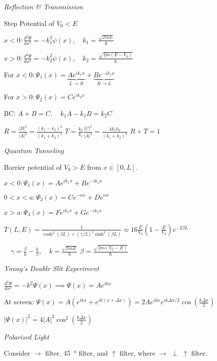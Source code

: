 \documentclass[twocolumn]{article}
\begin{document}
\vspace{-.5em}
\dotfill

\textit{Reflection \& Transmission}

Step Potential of $V_0 < E$

$x < 0: \frac{d^2 \Psi}{dx^2} = -k_1^2 \psi(x), \quad k_1 = \frac{\sqrt{2mE}}{\hbar}$

$x > 0: \frac{d^2 \Psi}{dx^2} = -k_2^2 \psi(x), \quad k_2 = \frac{\sqrt{2m(E-V_0)}}{\hbar}$

For $x < 0: \Psi_1(x) = \underbrace{A e^{ik_1 x}}_{L \to R} + \underbrace{Be^{-ik_1 x}}_{R \to L}$

For $x > 0: \Psi_2(x) = Ce^{ik_2 x}$

BC: $A + B = C, \quad k_1 A - k_1 B = k_2 C$

$R = \frac{|B|^2}{|A|^2} = \frac{(k_1 - k_2)^2}{(k_1 + k_2)^2}$ \hfill $T = \frac{k_2}{k_1} \frac{|C|^2}{|A|^2} = \frac{4k_1 k_2}{(k_1 + k_2)^2}$ \hfill $R + T = 1$

\dotfill

\textit{Quantum Tunneling}

Barrier potential of $V_0 > E$ from $x \in [0, L]$.

$x < 0: \Psi_1(x) = A e^{ik_1 x} + B e^{-i k_1 x}$

$0 < x < a: \Psi_2(x) = Ce^{-\alpha x} + De^{\alpha x}$

$x > a: \Psi_3(x) =  Fe^{ik_1 x} + Ge^{-ik_1 x}$

$T(L, E) = \frac{1}{\cosh^2(\beta L) + (\gamma/2)^2 \sinh^2(\beta L)} \approx 16\frac{E}{V_0} \left(1 - \frac{E}{V_0} \right) e^{-2\beta L}$

$\quad \gamma = \frac{\beta}{k} - \frac{k}{\beta}, \quad k = \frac{\sqrt{2mE}}{\hbar}$ \hfill $\beta = \frac{\sqrt{2m (V_0 - E)}}{\hbar}$

\dotfill

\textit{Young's Double Slit Experiment}

$\frac{d^2 \Psi}{dx^2} = -k^2 \Psi(x) \implies \Psi(x) = Ae^{ikx}$

At screen: $\Psi(x) = A(e^{ikx} + e^{ik(x+\Delta x)}) = 2A e^{ikx} e^{ik\Delta x / 2} \cos \left( \frac{k\Delta x}{2} \right)$

$|\Psi(x)|^2 = 4|A|^2 \cos^2 \left( \frac{k\Delta x}{2} \right)$

\dotfill

\textit{Polarized Light}

Consider $\rightarrow$ filter, \SI{45}{\degree} filter, and $\uparrow$ filter, where $\rightarrow$ $\perp$ $\uparrow$ filter.
\end{document}
